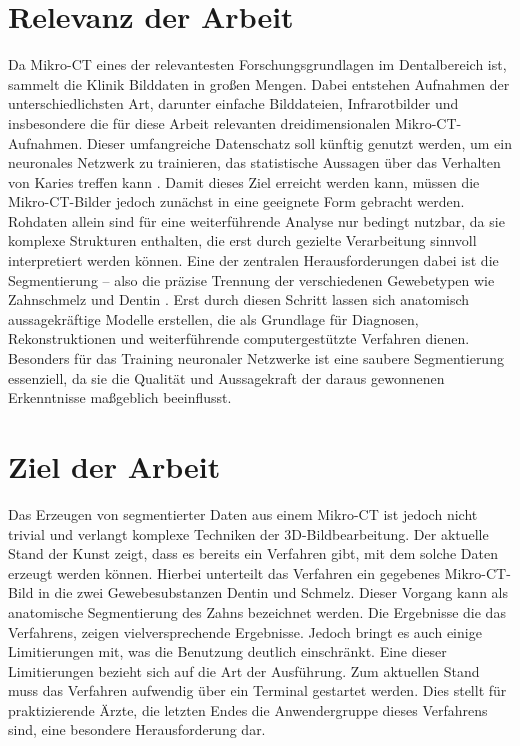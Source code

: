 \section{Relevanz der Arbeit}
\label{sec:relevanz_der_arbeit} Da Mikro-\ac{CT} eines der relevantesten Forschungsgrundlagen
im Dentalbereich ist, sammelt die Klinik Bilddaten in großen Mengen. Dabei entstehen
Aufnahmen der unterschiedlichsten Art, darunter einfache Bilddateien, Infrarotbilder
und insbesondere die für diese Arbeit relevanten dreidimensionalen Mikro-\ac{CT}-Aufnahmen.
Dieser umfangreiche Datenschatz soll künftig genutzt werden, um ein neuronales
Netzwerk zu trainieren, das statistische Aussagen über das Verhalten von Karies treffen
kann \citep[vgl.][S.~1]{walter2025projekt}. Damit dieses Ziel erreicht werden kann,
müssen die Mikro-\ac{CT}-Bilder jedoch zunächst in eine geeignete Form gebracht werden.
Rohdaten allein sind für eine weiterführende Analyse nur bedingt nutzbar, da sie
komplexe Strukturen enthalten, die erst durch gezielte Verarbeitung sinnvoll
interpretiert werden können. Eine der zentralen Herausforderungen dabei ist die Segmentierung
– also die präzise Trennung der verschiedenen Gewebetypen wie Zahnschmelz und Dentin
\citep[vgl.][S.~359]{lehmann2013bildverarbeitung}. Erst durch diesen Schritt lassen
sich anatomisch aussagekräftige Modelle erstellen, die als Grundlage für
Diagnosen, Rekonstruktionen und weiterführende computergestützte Verfahren dienen.
Besonders für das Training neuronaler Netzwerke ist eine saubere Segmentierung
essenziell, da sie die Qualität und Aussagekraft der daraus gewonnenen Erkenntnisse
maßgeblich beeinflusst.

\section{Ziel der Arbeit}
\label{sec:ziel_der_arbeit} Das Erzeugen von segmentierter Daten aus einem Mikro-\ac{CT}
ist jedoch nicht trivial und verlangt komplexe Techniken der 3D-Bildbearbeitung.
Der aktuelle Stand der Kunst zeigt, dass es bereits ein Verfahren gibt, mit dem solche
Daten erzeugt werden können. Hierbei unterteilt das Verfahren ein gegebenes
Mikro-\ac{CT}-Bild in die zwei Gewebesubstanzen Dentin und Schmelz. Dieser
Vorgang kann als anatomische Segmentierung des Zahns bezeichnet werden. Die Ergebnisse
die das Verfahrens, zeigen vielversprechende Ergebnisse. Jedoch bringt es auch einige
Limitierungen mit, was die Benutzung deutlich einschränkt. Eine dieser Limitierungen
bezieht sich auf die Art der Ausführung. Zum aktuellen Stand muss das Verfahren
aufwendig über ein Terminal gestartet werden. Dies stellt für praktizierende Ärzte,
die letzten Endes die Anwendergruppe dieses Verfahrens sind, eine besondere Herausforderung
dar.

